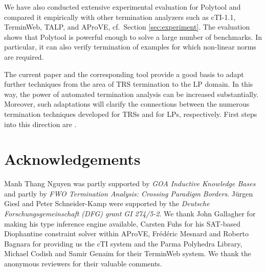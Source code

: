 \documentclass[envcountsame]{tlp}
\newcounter{ex:der-lastsymconsctr}
\begin{document}
We have also conducted extensive experimental evaluation for \textsf{Polytool}
and compared it empirically with other
termination analyzers such as \textsf{cTI-1.1}, \textsf{TerminWeb}, \textsf{TALP}, and
\textsf{AProVE}, cf.\ Section \ref{sec:experiment}. The evaluation shows that
\textsf{Polytool} is powerful 
enough to solve a large number of benchmarks. In particular, it can also verify
termination of examples for which non-linear norms are required. 

The current paper and the corresponding tool
provide a good basis to adapt
further techniques from the area of TRS
termination to the LP domain. In this way, 
the power of automated termination analysis can be increased
substantially. Moreover, such adaptations will clarify
the connections between the numerous termination techniques
developed for TRSs and for LPs, respectively. First steps into this direction
are
\cite{Nguyenetall-LOPSTR07,LOPSTR09}.

\section{Acknowledgements}
Manh Thang Nguyen was partly supported by \emph{GOA Inductive Knowledge Bases} and partly by
\emph{FWO Termination Analysis: Crossing Paradigm Borders}. J\"urgen Giesl and
Peter
Schneider-Kamp were supported by the \emph{Deutsche Forschungsgemeinschaft (DFG)
           grant GI 274/5-2}.
We thank John Gallagher for making his type inference engine available,
Carsten Fuhs for his SAT-based Diophantine constraint solver within
\textsf{AProVE}, Fr\'ed\'eric Mesnard and Roberto  
Bagnara for providing us the {\sf cTI} system and the \textsf{Parma Polyhedra
Library}, Michael Codish and Samir Genaim for their \textsf{TerminWeb}
system. We thank the anonymous reviewers for their valuable comments.


\end{document}
